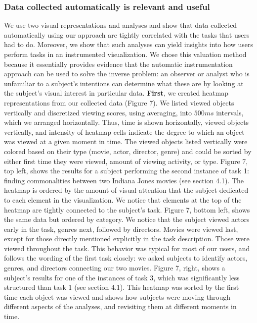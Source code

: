 \subsubsection{Data collected automatically is relevant and useful}
\label{sec:EvalDataCollected}
We use two visual representations and analyses and show that data collected automatically using our approach are tightly correlated with the tasks that users had to do. Moreover, we show that such analyses can yield insights into how users perform tasks in an instrumented visualization. We chose this valuation method because it essentially provides evidence that the automatic instrumentation approach can be used to solve the inverse problem: an observer or analyst who is unfamiliar to a subject's intentions can determine what these are by looking at the subject's visual interest in particular data. 
\textbf{First}, we created heatmap representations from our collected data (Figure 7). We listed viewed objects vertically and discretized viewing scores, using averaging, into $500ms$ intervals, which we arranged horizontally. Thus, time is shown horizontally, viewed objects vertically, and intensity of heatmap cells indicate the degree to which an object was viewed at a given moment in time. The viewed objects listed vertically were colored based on their type (movie, actor, director, genre) and could be sorted by either first time they were viewed, amount of viewing activity, or type. 
Figure 7, top left, shows the results for a subject performing the second instance of task 1: finding commonalities between two Indiana Jones movies (see section 4.1). The heatmap is ordered by the amount of visual attention that the subject dedicated to each element in the visualization. We notice that elements at the top of the heatmap are tightly connected to the subject's  task.  Figure 7, bottom left, shows the same data but ordered by category. We notice that the subject viewed actors early in the task, genres next, followed by directors. Movies were viewed last, except for those directly mentioned explicitly in the task description. Those were viewed throughout the task. This behavior was typical for most of our users, and follows the wording of the first task closely: we asked subjects to identify actors, genres, and directors connecting our two movies. 
Figure 7, right, shows a subject's results for one of the instances of task 3, which was significantly less structured than task 1 (see section 4.1). This heatmap  was sorted by the first time each object was viewed and shows how subjects were moving through different aspects of the analyses, and revisiting them at different moments in time. 
